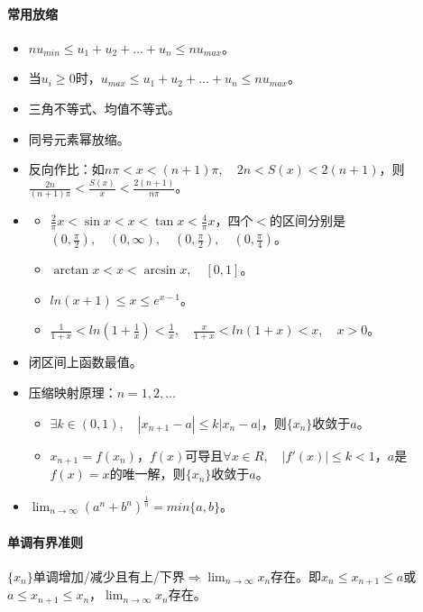 \documentclass[
12pt, %
a4paper, 
oneside, %
]{scrartcl}
\begin{document}
\paragraph{常用放缩}
\begin{itemize}
\item $ n u_{min} \leq u_1 + u_2 + \dots +u_n \leq n u_{max} $。
\item 当$ u_i \geq 0 $时，$ u_{max} \leq u_1 + u_2 + \dots +u_n \leq n u_{max} $。
\item 三角不等式、均值不等式。
\item 同号元素幂放缩。
\item 反向作比：如$ n \pi < x < (n + 1)\pi, \quad 2n < S(x) < 2(n + 1) $，则$ \frac{2n}{(n + 1)\pi} < \frac{S(x)}{x} < \frac{2(n + 1)}{n \pi} $。
\item 
\begin{itemize}
\item $ \frac{2}{\pi}x < \sin x < x < \tan x < \frac{4}{\pi}x $，四个$ < $的区间分别是$ (0, \frac{\pi}{2}), \quad (0, \infty), \quad (0, \frac{\pi}{2}), \quad (0, \frac{\pi}{4}) $。
\item $ \arctan x < x < \arcsin x, \quad [0, 1] $。
\item $ ln(x + 1) \leq x \leq e^{x - 1} $。
\item $ \frac{1}{1 + x} < ln(1 + \frac{1}{x}) < \frac{1}{x}, \quad \frac{x}{1 + x} < ln(1 + x) < x, \quad x > 0 $。
\end{itemize}
\item 闭区间上函数最值。
\item 压缩映射原理：$ n = 1, 2, \dots $
\begin{itemize}
\item $ \exists k \in (0, 1), \quad |x_{n + 1} - a| \leq k|x_n - a| $，则$ \{x_n\} $收敛于$ a $。
\item $ x_{n + 1} = f(x_n) $，$ f(x) $可导且$ \forall x \in R, \quad |f'(x)| \leq k < 1 $，$ a $是$ f(x) = x $的唯一解，则$ \{x_n\} $收敛于$ a $。
\end{itemize}
\item $ \lim_{n \to \infty} (a^n + b^n)^{\frac{1}{n}} = min\{a, b\} $。
\end{itemize}
\paragraph{单调有界准则}
$ \{x_n\} $单调增加/减少且有上/下界$ \Rightarrow $$ \lim_{n \to \infty} x_n $存在。即$ x_n \leq x_{n + 1} \leq a $或$ a \leq x_{n + 1} \leq x_n $，$ \lim_{n \to \infty} x_n $存在。
\end{document}

